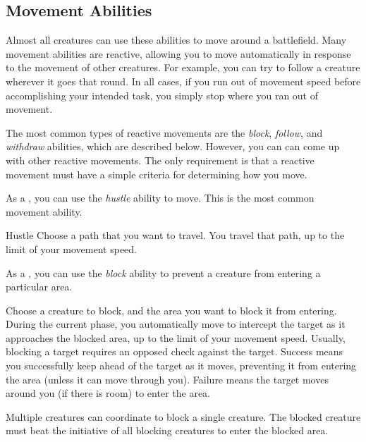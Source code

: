     \subsection{Movement Abilities}\label{Movement Abilities}

        Almost all creatures can use these abilities to move around a battlefield.
        Many movement abilities are reactive, allowing you to move automatically in response to the movement of other creatures.
        For example, you can try to follow a creature wherever it goes that round.
        In all cases, if you run out of movement speed before accomplishing your intended task, you simply stop where you ran out of movement.

        The most common types of reactive movements are the \textit{block}, \textit{follow}, and \textit{withdraw} abilities, which are described below.
        However, you can can come up with other reactive movements.
        The only requirement is that a reactive movement must have a simple criteria for determining how you move.

         As a , you can use the \textit{hustle} ability to move.
        This is the most common movement ability.

        \begin{freeability}{Hustle}
            Choose a path that you want to travel.  You travel that path, up to the limit of your movement speed.
        \end{freeability}

         As a , you can use the \textit{block} ability to prevent a creature from entering a particular area.

        \begin{freeability}{}
            Choose a creature to block, and the area you want to block it from entering.
            During the current phase, you automatically move to intercept the target as it approaches the blocked area, up to the limit of your movement speed.
            Usually, blocking a target requires an opposed  check against the target.
            Success means you successfully keep ahead of the target as it moves, preventing it from entering the area (unless it can move through you).
            Failure means the target moves around you (if there is room) to enter the area.

            Multiple creatures can coordinate to block a single creature.
            The blocked creature must beat the initiative of all blocking creatures to enter the blocked area.
        \end{freeability}

